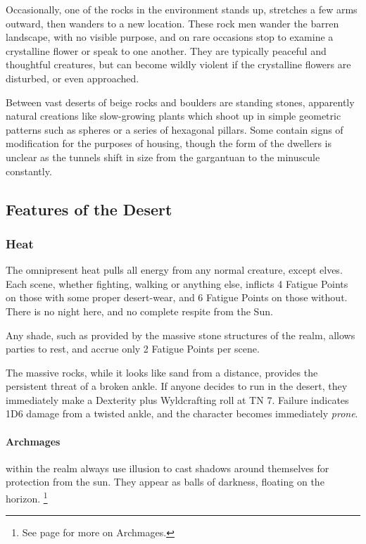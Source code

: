 \begin{multicols}{2}
Occasionally, one of the rocks in the environment stands up, stretches a few arms outward, then wanders to a new location.
These rock men wander the barren landscape, with no visible purpose, and on rare occasions stop to examine a crystalline flower or speak to one another.
They are typically peaceful and thoughtful creatures, but can become wildly violent if the crystalline flowers are disturbed, or even approached.

Between vast deserts of beige rocks and boulders are standing stones, apparently natural creations like slow-growing plants which shoot up in simple geometric patterns such as spheres or a series of hexagonal pillars.  Some contain signs of modification for the purposes of housing, though the form of the dwellers is unclear as the tunnels shift in size from the gargantuan to the minuscule constantly.

\subsection{Features of the Desert}

\subsubsection{Heat}

The omnipresent heat pulls all energy from any normal creature, except elves.
Each scene, whether fighting, walking or anything else, inflicts 4 Fatigue Points on those with some proper desert-wear, and 6 Fatigue Points on those without.
There is no night here, and no complete respite from the Sun.

Any shade, such as provided by the massive stone structures of the realm, allows parties to rest, and accrue only 2 Fatigue Points per scene.

The massive rocks, while it looks like sand from a distance, provides the persistent threat of a broken ankle.
If anyone decides to run in the desert, they immediately make a Dexterity plus Wyldcrafting roll at TN 7.
Failure indicates 1D6 damage from a twisted ankle, and the character becomes immediately \emph{prone}.

\paragraph{Archmages} within the realm always use illusion to cast shadows around themselves for protection from the sun.
They appear as balls of darkness, floating on the horizon.%
\footnote{See page \pageref{archmage} for more on Archmages.}


\end{multicols}
